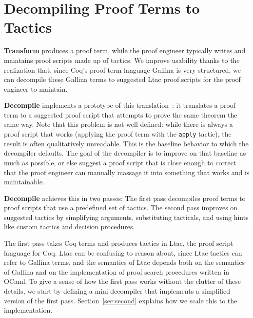 \section{Decompiling Proof Terms to Tactics}
\label{sec:decompiler}

\textbf{Transform} produces a proof term,
while the proof engineer typically writes and maintains proof scripts made up of tactics.
We improve usability thanks to the realization that, since Coq's proof term language Gallina is very structured,
we can decompile these Gallina terms to suggested Ltac proof scripts for the proof engineer to maintain.


\textbf{Decompile} implements a prototype of this translation~\href{https://github.com/uwplse/pumpkin-pi/blob/silent/plugin/src/coq-plugin-lib/src/coq/decompiler/decompiler.ml}{}: %
it translates a proof term to a suggested proof script that attempts to prove the same theorem the same way.
Note that this problem is not well defined: while there is always a proof script that 
works (applying the proof term with the \lstinline{apply} tactic), the result is often qualitatively unreadable.
This is the baseline behavior to which the decompiler defaults.
The goal of the decompiler is to improve on that baseline as much as possible,
or else suggest a proof script that is close enough to correct that the proof engineer can
manually massage it into something that works and is maintainable.

\textbf{Decompile} achieves this in two passes: The first pass decompiles proof terms to proof scripts that use a predefined set of tactics.
The second pass improves on suggested tactics by simplifying arguments, substituting tacticals, and using
hints like custom tactics and decision procedures.

The first pass takes Coq terms and produces tactics in Ltac, the proof script language for Coq.
Ltac can be confusing to reason about, since Ltac tactics can refer to Gallina terms, and the semantics of Ltac depends both on the
semantics of Gallina and on the implementation of proof search procedures written in OCaml.
To give a sense of how the first pass works without the clutter of these details, we start by defining a mini decompiler that 
implements a simplified version of the first pass.
Section~\ref{sec:second} explains how we scale this to the implementation.

